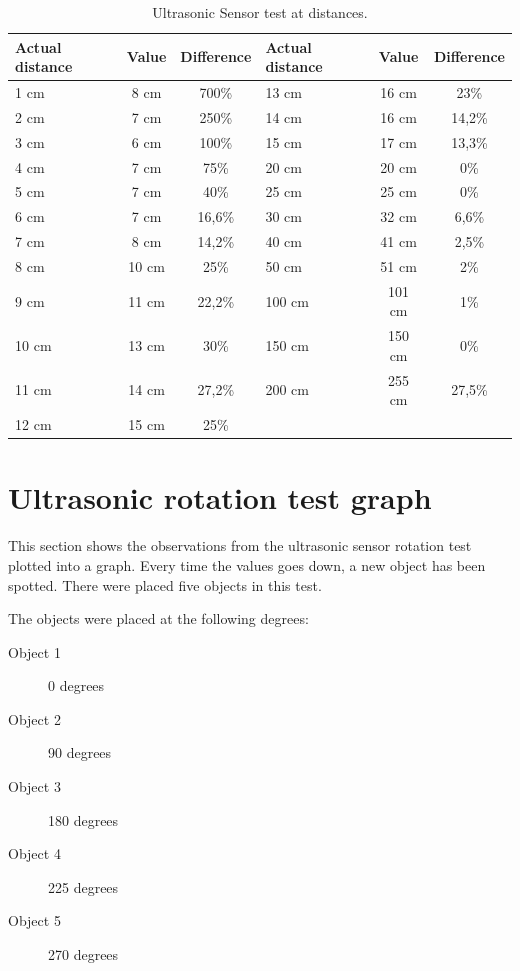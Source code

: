 \begin{table}[H]
	\centering
    \begin{tabular}{|lcc|lcc|}
    \hline  
    \rowcolor{DGray}
    \textbf{Actual distance} & \textbf{Value}  & \textbf{Difference} &\textbf{Actual distance} & \textbf{Value}  & \textbf{Difference}\\ \hline
    1 cm     & 8 cm     & 700\%  &    13 cm     & 16 cm     & 23\% \\
    2 cm     & 7 cm     & 250\%  &    14 cm     & 16 cm     & 14,2\% \\
    3 cm     & 6 cm     & 100\%  &    15 cm     & 17 cm     & 13,3\% \\
    4 cm     & 7 cm     & 75\%   &    20 cm     & 20 cm     & 0\% \\
    5 cm     & 7 cm     & 40\%   &    25 cm     & 25 cm     & 0\% \\
    6 cm     & 7 cm     & 16,6\% &    30 cm     & 32 cm     & 6,6\% \\
    7 cm     & 8 cm     & 14,2\% &    40 cm     & 41 cm     & 2,5\% \\
    8 cm     & 10 cm    & 25\%   &    50 cm     & 51 cm     & 2\% \\
    9 cm     & 11 cm    & 22,2\% &    100 cm    & 101 cm    & 1\% \\
    10 cm    & 13 cm    & 30\%   &    150 cm    & 150 cm    & 0\% \\
    11 cm    & 14 cm    & 27,2\% &    200 cm    & 255 cm    & 27,5\% \\
    12 cm    & 15 cm    & 25\%   &              &           &\\
    \hline 
    \end{tabular}
    \caption{\label{table:app_ultrasonic_sensor_test} Ultrasonic Sensor test at distances.}
\end{table}


\newpage
\section*{Ultrasonic rotation test graph} \label{app:sonar-test-graph}
This section shows the observations from the ultrasonic sensor rotation test plotted into a graph. Every time the values goes down, a new object has been spotted. There were placed five objects in this test.

The objects were placed at the following degrees:
\begin{description}
\item[Object 1] 0 degrees
\item[Object 2] 90 degrees
\item[Object 3] 180 degrees
\item[Object 4] 225 degrees
\item[Object 5] 270 degrees
\end{description}

